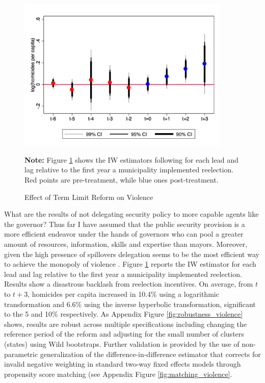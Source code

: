 \documentclass[12pt]{amsart}
\numberwithin{equation}{section}
\theoremstyle{definition}
\theoremstyle{definition}
\theoremstyle{definition}
\begin{document}
\begin{figure}[h] 
\centering
 \caption{Effect of Term Limit Reform on Violence}
 \label{fig:as_violence}
\includegraphics[width=0.9\textwidth]{../Figures/catts_homicides.png}
       \captionsetup{justification=centering}
       
 \textbf{Note:} Figure \ref{fig:as_violence} shows the IW estimators following \citet{abraham_sun_2020} for each lead and lag relative to the first year a municipality implemented reelection. Red points are pre-treatment, while blue ones post-treatment. 
    
\end{figure}    
     

What are the results of not delegating security policy to more capable agents like the governor? Thus far I have assumed that the public security provision is a more efficient endeavor under the hands of governors who can pool a greater amount of resources, information, skills and expertise than mayors. Moreover, given the high presence of spillovers delegation seems to be the most efficient way to achieve the monopoly of violence \citep{oates_1972}. Figure \ref{fig:as_violence} reports the IW estimator for each lead and lag relative to the first year a municipality implemented reelection. Results show a disastrous backlash from reelection incentives. On average, from $t$ to $t+3$, homicides per capita increased in 10.4\% using a logarithmic transformation and 6.6\% using the inverse hyperbolic transformation, significant to the 5 and 10\% respectively. As Appendix Figure \ref{fig:robustness_violence} shows, results are robust across multiple specifications including changing the reference period of the reform and adjusting for the small number of clusters (states) using Wild bootstraps. Further validation is provided by the use of \citet{imai_etal_2020} non-parametric generalization of the difference-in-difference estimator that corrects for invalid negative weighting in standard two-way fixed effects models through propensity score matching (see Appendix Figure \ref{fig:matching_violence}. 
\end{document}
